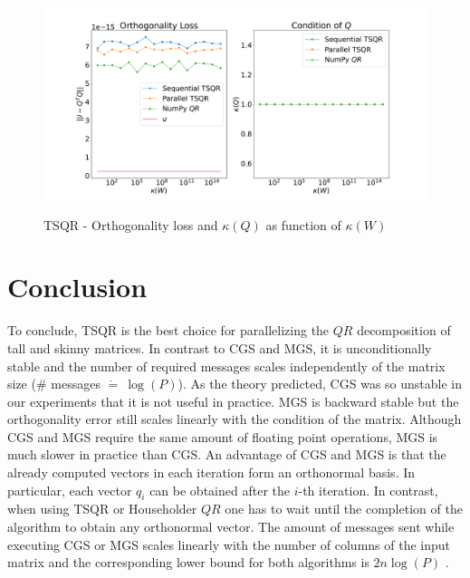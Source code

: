 \documentclass{article}
\begin{document}
\begin{figure}[t]
    \centering %
    \caption{TSQR - Orthogonality loss and $\kappa(Q)$ as function of $\kappa(W)$}
    \includegraphics[width=\textwidth, trim = 0cm 0cm 0cm 1cm]
        {./plots/TSQR_Orthogonality_Error_complete.pdf}
    \label{fig:orthoErrorTSQR}
\end{figure}

\section{Conclusion}
To conclude, TSQR is the best choice for parallelizing the $QR$ decomposition of
tall and skinny matrices. In contrast to CGS and MGS, it is unconditionally
stable and the number of required messages scales independently of the matrix
size ($\#$ messages $\dot{=} \ \log(P)$). As the theory predicted, CGS was so
unstable in our experiments that it is not useful in practice. MGS is backward
stable but the orthogonality error still scales linearly with the condition of
the matrix. Although CGS and MGS require the same amount of floating point
operations, MGS is much slower in practice than CGS. An advantage of CGS and MGS
is that the already computed vectors in each iteration form an orthonormal
basis. In particular, each vector $q_i$ can be obtained after the $i$-th
iteration. In contrast, when using TSQR or Householder $QR$ one has to wait
until the completion of the algorithm to obtain any orthonormal vector. The
amount of messages sent while executing CGS or MGS scales linearly with the
number of columns of the input matrix and the corresponding lower bound for both
algorithms is $2n \log(P)$ \cite{Grigori:2008}.

\clearpage{}


\end{document}
